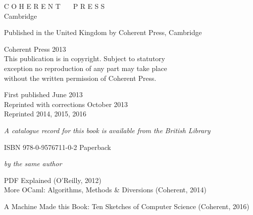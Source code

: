 \documentclass[]{book}
\newcommand{\smspace}{\vspace{4mm}}
\begin{document}
\thispagestyle{empty}

{\centering

\vspace{10mm}


\noindent C O H E R E N T \ \ \ P R E S S\\ \vspace{1mm} \footnotesize Cambridge

\vspace{3mm}

\noindent Published in the United Kingdom by Coherent Press, Cambridge

\vspace{3mm}

\noindent {\small \copyright} Coherent Press 2013\\

\vspace{3mm}
\noindent This publication is in copyright. Subject to statutory\\ exception no reproduction of any part may take place\\ without the written permission of Coherent Press.\\

\vspace{3mm}

\noindent First published June 2013\\
\noindent Reprinted with corrections October 2013\\
\noindent Reprinted 2014, 2015, 2016

\vspace{3mm}



\noindent \textit{A catalogue record for this book is available from the British Library}\\

\smspace

\noindent ISBN 978-0-9576711-0-2 Paperback\\


\vspace{20mm}

\noindent \textit{by the same author}\\

\smspace

PDF Explained (O'Reilly, 2012)\\

\vspace{1mm}
More OCaml: Algorithms, Methods \& Diversions (Coherent, 2014) 

\vspace{1mm}
A Machine Made this Book: Ten Sketches of Computer Science (Coherent, 2016)

}
\cleardoublepage
\end{document}
